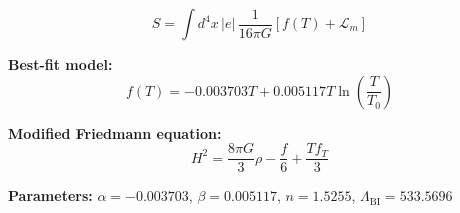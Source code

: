 
\begin{equation}
  S = \int d^4x \, |e| \, \frac{1}{16\pi G} \left[ f(T) + \mathcal{L}_m \right]
\end{equation}

\textbf{Best-fit model:}
\begin{equation}
  f(T) = -0.003703 T + 0.005117 T \ln\!\left(\frac{T}{T_0}\right)
\end{equation}

\textbf{Modified Friedmann equation:}
\begin{equation}
  H^2 = \frac{8\pi G}{3} \rho - \frac{f}{6} + \frac{T f_T}{3}
\end{equation}

\textbf{Parameters:}
$\alpha = -0.003703$, \quad
$\beta = 0.005117$, \quad
$n = 1.5255$, \quad
$\Lambda_{\text{BI}} = 533.5696$